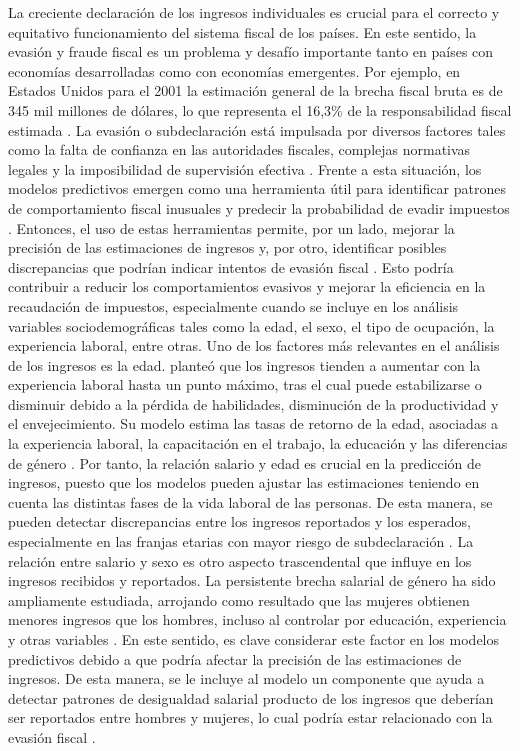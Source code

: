 \documentclass[12pt,a4paper,onecolumn]{article}
\begin{document}
La creciente declaración de los ingresos individuales es crucial para el correcto y equitativo funcionamiento del sistema fiscal de los países. En este sentido, la evasión y fraude fiscal es un problema y desafío importante tanto en países con economías desarrolladas como con economías emergentes. Por ejemplo, en Estados Unidos para el 2001 la estimación general de la brecha fiscal bruta es de 345 mil millones de dólares, lo que representa el 16,3\% de la responsabilidad fiscal estimada \citep{slemrod2007}. La evasión o subdeclaración está impulsada por diversos factores tales como la falta de confianza en las autoridades fiscales, complejas normativas legales y la imposibilidad de supervisión efectiva \citep{alm2012}.
\bigbreak
Frente a esta situación, los modelos predictivos emergen como una herramienta útil para identificar patrones de comportamiento fiscal inusuales y predecir la probabilidad de evadir impuestos \citep{pomeranz2015}. Entonces, el uso de estas herramientas permite, por un lado, mejorar la precisión de las estimaciones de ingresos y, por otro, identificar posibles discrepancias que podrían indicar intentos de evasión fiscal \citep{torgler2007}. Esto podría contribuir a reducir los comportamientos evasivos y mejorar la eficiencia en la recaudación de impuestos, especialmente cuando se incluye en los análisis variables sociodemográficas tales como la edad, el sexo, el tipo de ocupación, la experiencia laboral, entre otras.
\bigbreak
Uno de los factores más relevantes en el análisis de los ingresos es la edad. \cite{mincer1974} planteó que los ingresos tienden a aumentar con la experiencia laboral hasta un punto máximo, tras el cual puede estabilizarse o disminuir debido a la pérdida de habilidades, disminución de la productividad y el envejecimiento. Su modelo estima las tasas de retorno de la edad, asociadas a la experiencia laboral, la capacitación en el trabajo, la educación y las diferencias de género \citep{Chiswick2006}. Por tanto, la relación salario y edad es crucial en la predicción de ingresos, puesto que los modelos pueden ajustar las estimaciones teniendo en cuenta las distintas fases de la vida laboral de las personas. De esta manera, se pueden detectar discrepancias entre los ingresos reportados y los esperados, especialmente en las franjas etarias con mayor riesgo de subdeclaración \citep{pomeranz2015}.
\bigbreak
La relación entre salario y sexo es otro aspecto trascendental que influye en los ingresos recibidos y reportados. La persistente brecha salarial de género ha sido ampliamente estudiada, arrojando como resultado que las mujeres obtienen menores ingresos que los hombres, incluso al controlar por educación, experiencia y otras variables \citep{blau2017}. En este sentido, es clave considerar este factor en los modelos predictivos debido a que podría afectar la precisión de las estimaciones de ingresos. De esta manera, se le incluye al modelo un componente que ayuda a detectar patrones de desigualdad salarial producto de los ingresos que deberían ser reportados entre hombres y mujeres, lo cual podría estar relacionado con la evasión fiscal \citep{goldin2014}.
\end{document}
